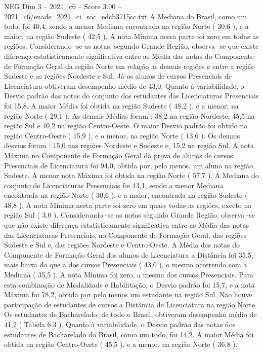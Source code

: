 \begin{textsample}{NEG Dim 3 – 2021\_c6 – Score 3.00 – 2021\_c6/enade\_2021\_ci\_soc\_edcb3715cc.txt}
A Mediana do Brasil, como um todo, foi 40,4, sendo a menor Mediana encontrada na região Norte ( 30,6 ), e a maior, na região Sudeste ( 42,5 ).
A nota Mínima nessa parte foi zero em todas as regiões.
Considerando -se as notas, segundo Grande Região, observa -se que existe diferença estatisticamente significativa entre as Média das notas do Componente de Formação Geral da região Norte em relação as demais regiões e entre a região Sudeste e as regiões Nordeste e Sul.
Já os alunos de cursos Presenciais de Licenciatura obtiveram desempenho médio de 43,0.
Quanto à variabilidade, o Desvio padrão das notas do conjunto dos estudantes das Licenciaturas Presenciais foi 15,8.
A maior Média foi obtida na região Sudeste ( 48,2 ), e a menor, na região Norte ( 29,1 ).
As demais Médias foram : 38,2 na região Nordeste, 45,5 na região Sul e 40,2 na região Centro-Oeste.
O maior Desvio padrão foi obtido na região Centro-Oeste ( 15,9 ), e o menor, na região Norte ( 13,6 ).
Os demais desvios foram : 15,0 nas regiões Nordeste e Sudeste e, 15,2 na região Sul.
A nota Máxima no Componente de Formação Geral da prova de alunos de cursos Presenciais de Licenciatura foi 94,0, obtida por, pelo menos, um aluno na região Sudeste.
A menor nota Máxima foi obtida na região Norte ( 57,7 ).
A Mediana do conjunto de Licenciaturas Presenciais foi 43,1, sendo a menor Mediana encontrada na região Norte ( 30,6 ), e a maior, encontrada na região Sudeste ( 48,8 ).
A nota Mínima nesta parte foi zero em quase todas as regiões, exceto na região Sul ( 3,0 ).
Considerando -se as notas segundo Grande Região, observa -se que não existe diferença estatisticamente significativa entre as Média das notas das Licenciaturas Presenciais, no Componente de Formação Geral, das regiões Sudeste e Sul e, das regiões Nordeste e Centro-Oeste.
A Média das notas do Componente de Formação Geral dos alunos de Licenciatura a Distância foi 35,5, mais baixa do que a dos cursos Presenciais ( 43,0 ), o mesmo ocorrendo com a Mediana ( 35,5 ).
A nota Mínima foi zero, a mesma dos cursos Presenciais.
Para esta combinação de Modalidade e Habilitação, o Desvio padrão foi 15,7, e a nota Máxima foi 78,2, obtida por pelo menos um estudante na região Sul.
Não houve participação de estudantes de cursos a Distância de Licenciatura na região Norte.
Os estudantes de Bacharelado, de todo o Brasil, obtiveram desempenho médio de 41,2 ( Tabela 6.3 ).
Quanto à variabilidade, o Desvio padrão das notas dos estudantes de Bacharelado do Brasil, como um todo, foi 14,2.
A maior Média foi obtida na região Centro-Oeste ( 45,5 ), e a menor, na região Norte ( 36,8 ).

\end{textsample}
